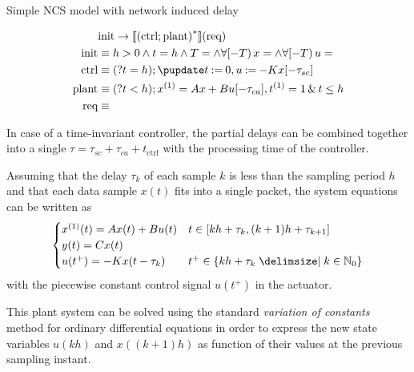         \begin{algorithm}
            \caption{Simple NCS model with network induced delay}
            \label{mdl:ncs} %
            \begin{align*}
                &\init \limply \dbox{\hrepeat{(\ctrl;\plant)}}{(\req)}\\
                \init &\equiv h>0\land t=h\land T=\land \hs{x=}\land \hs{u=}\\
                \ctrl &\equiv (\htest{t=h}); \hupdate{\humod{t}{0},\humod{u}{-K\x[-\tau_{sc}]}}\\
                \plant &\equiv (\htest{t<h}); \hevolvein{\D{x}=Ax+Bu[-\tau_{ca}]\syssep \D{t}=1}{t\leq h}\\
                \req &\equiv
            \end{align*}
        \end{algorithm}

        In case of a time-invariant controller, the partial delays can be combined together into a single $\tau=\tau_{sc}+\tau_{ca}+t_{\text{ctrl}}$ with the processing time of the controller.

        Assuming that the delay $\tau_k$ of each sample $k$ is less than the sampling period $h$ and that each data sample $x(t)$ fits into a single packet, the system equations can be written as
        \begin{equation*}
            \begin{cases}
                \D{x}(t) = Ax(t) + Bu(t) &
                t\in\compactum{kh+\tau_k}{(k+1)h+\tau_{k+1}}\\
                y(t) = Cx(t) &\\
                u(t^+) = -Kx(t-\tau_k) &
                t^+\in\set{kh+\tau_k\with k\in\N_0}
            \end{cases}
        \end{equation*}
        with the piecewise constant control signal $u(t^+)$ in the actuator.

        This plant system can be solved using the standard \emph{variation of constants} method for ordinary differential equations in order to express the new state variables $u(kh)$ and $x((k+1)h)$ as function of their values at the previous sampling instant.


